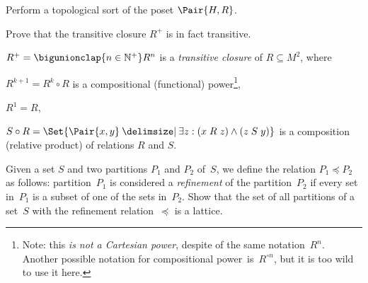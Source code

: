 \documentclass[a4paper,12pt]{article}
\begin{document}
\begin{tasks}
\begin{subtasks}
        \item Perform a topological sort of the poset $\Pair{H, R}$.
    \end{subtasks}


    \item Prove that the transitive closure $R^{+}$ is in fact transitive.

    \begin{definition}
        $R^{+} = \bigunionclap{n \in \NaturalPlus} R^n$ is a \textit{transitive closure} of $R \subseteq M^2$, where
        \begin{terms}
            \item $R^{k+1} = R^k \circ R$ is a compositional (functional) power\footnote{Note: this \emph{is not a Cartesian power}, despite of the same notation~$R^n$. Another possible notation for compositional power~is~$R^{\circ n}$, but it is too wild to use it here.},
            \item $R^1 = R$,
            \item $S \circ R = \Set{\Pair{x,y} \given \exists z : (x \rel[R] z) \land (z \rel[S] y)}$ is a composition (relative product) of relations $R$ and $S$.
        \end{terms}
    \end{definition}




    \item Given a set $S$ and two partitions $P_1$ and $P_2$ of~$S$, we define the relation $P_1 \preceq P_2$ as follows: partition~$P_1$ is considered a \textit{refinement} of the partition~$P_2$ if every set in~$P_1$ is a subset of one of the sets in~$P_2$.
    Show that the set of all partitions of a set~$S$ with the refinement relation~$\preceq$ is a lattice.


\end{tasks}
\end{document}
